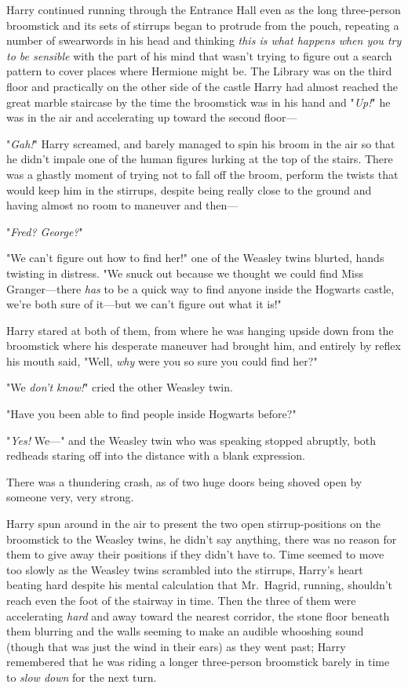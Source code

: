 Harry continued running through the Entrance Hall even as the long three-person
broomstick and its sets of stirrups began to protrude from the pouch, repeating
a number of swearwords in his head and thinking \emph{this is what happens when
you try to be sensible} with the part of his mind that wasn't trying to figure
out a search pattern to cover places where Hermione might be. The Library was
on the third floor and practically on the other side of the castle{\el}
Harry had almost reached the great marble staircase by the time the broomstick
was in his hand and "\emph{Up!}" he was in the air and accelerating up toward
the second floor---

"\emph{Gah!}" Harry screamed, and barely managed to spin his broom in the air
so that he didn't impale one of the human figures lurking at the top of the
stairs. There was a ghastly moment of trying not to fall off the broom, perform
the twists that would keep him in the stirrups, despite being really close to
the ground and having almost no room to maneuver and then---

"\emph{Fred? George?}"

"We can't figure out how to find her!" one of the Weasley twins blurted, hands
twisting in distress. "We snuck out because we thought we could find Miss
Granger---there \emph{has} to be a quick way to find anyone inside the Hogwarts
castle, we're both sure of it---but we can't figure out what it is!"

Harry stared at both of them, from where he was hanging upside down from the
broomstick where his desperate maneuver had brought him, and entirely by reflex
his mouth said, "Well, \emph{why} were you so sure you could find her?"

"We \emph{don't know!}" cried the other Weasley twin.

"Have you been able to find people inside Hogwarts before?"

"\emph{Yes!} We\mbox{---}" and the Weasley twin who was speaking stopped abruptly,
both redheads staring off into the distance with a blank expression.

There was a thundering crash, as of two huge doors being shoved open by someone
very, very strong.

Harry spun around in the air to present the two open stirrup-positions on the
broomstick to the Weasley twins, he didn't say anything, there was no reason
for them to give away their positions if they didn't have to. Time seemed to
move too slowly as the Weasley twins scrambled into the stirrups, Harry's heart
beating hard despite his mental calculation that Mr.~Hagrid, running, shouldn't
reach even the foot of the stairway in time. Then the three of them were
accelerating \emph{hard} and away toward the nearest corridor, the stone floor
beneath them blurring and the walls seeming to make an audible whooshing sound
(though that was just the wind in their ears) as they went past; Harry
remembered that he was riding a longer three-person broomstick barely in time
to \emph{slow down} for the next turn.

